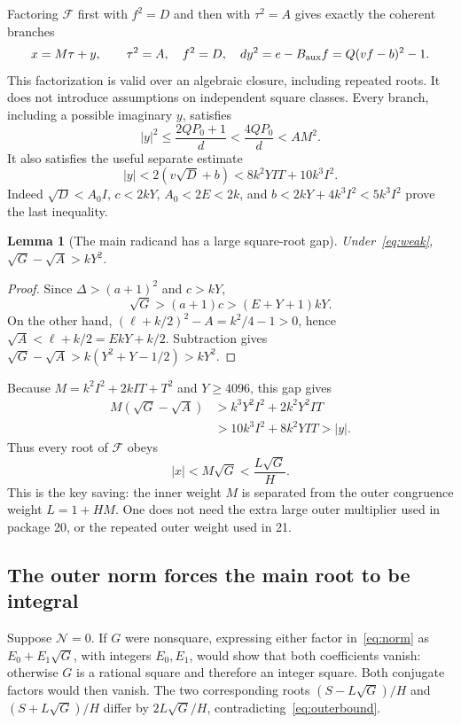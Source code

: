 \documentclass[11pt,a4paper]{article}
\newtheorem{lemma}[theorem]{Lemma}
\theoremstyle{remark}\newtheorem{remark}[theorem]{Remark}
\begin{document}
Factoring $\mathcal F$ first with $f^2=D$ and then with $\tau^2=A$
gives exactly the coherent branches
\begin{equation}
 x=M\tau+y,\qquad \tau^2=A,\quad f^2=D,\quad
 dy^2=e-B_{\rm aux}f=Q(vf-b)^2-1.
 \label{eq:branches}
\end{equation}
This factorization is valid over an algebraic closure, including repeated
roots. It does not introduce assumptions on independent square classes.
Every branch, including a possible imaginary $y$, satisfies
\begin{equation}
 |y|^2\le\frac{2QP_0+1}{d}<\frac{4QP_0}{d}<AM^2.
 \label{eq:ybound}
\end{equation}
It also satisfies the useful separate estimate
\[
 |y|<2(v\sqrt D+b)
       <8k^2YIT+10k^3I^2.
\]
Indeed $\sqrt D<A_0I$, $c<2kY$, $A_0<2E<2k$, and
$b<2kY+4k^3I^2<5k^3I^2$ prove the last inequality.

\begin{lemma}[The main radicand has a large square-root gap]
\label{lem:gap}
Under~\eqref{eq:weak}, $\sqrt G-\sqrt A>kY^2$.
\end{lemma}
\begin{proof}
Since $\Delta>(a+1)^2$ and $c>kY$,
\[
 \sqrt G>(a+1)c>(E+Y+1)kY.
\]
On the other hand,
$(\ell+k/2)^2-A=k^2/4-1>0$, hence
$\sqrt A<\ell+k/2=EkY+k/2$. Subtraction gives
$\sqrt G-\sqrt A>k(Y^2+Y-1/2)>kY^2$.
\end{proof}

Because $M=k^2I^2+2kIT+T^2$ and $Y\ge4096$, this gap gives
\begin{align*}
 M(\sqrt G-\sqrt A)
 &>k^3Y^2I^2+2k^2Y^2IT\\
 &>10k^3I^2+8k^2YIT>|y|.
\end{align*}
Thus every root of $\mathcal F$ obeys
\begin{equation}
 \boxed{|x|<M\sqrt G<\frac{L\sqrt G}{H}.}
 \label{eq:outerbound}
\end{equation}
This is the key saving: the inner weight $M$ is separated from the outer
congruence weight $L=1+HM$. One does not need the extra large outer
multiplier used in package 20, or the repeated outer weight used in 21.

\subsection{The outer norm forces the main root to be integral}

Suppose $\mathcal N=0$. If $G$ were nonsquare, expressing either
factor in~\eqref{eq:norm} as $E_0+E_1\sqrt G$, with integers $E_0,E_1$,
would show that both coefficients vanish: otherwise $G$ is a rational
square and therefore an integer square. Both conjugate factors would
then vanish. The two corresponding roots
$(S-L\sqrt G)/H$ and $(S+L\sqrt G)/H$ differ by
$2L\sqrt G/H$, contradicting~\eqref{eq:outerbound}.
\end{document}
